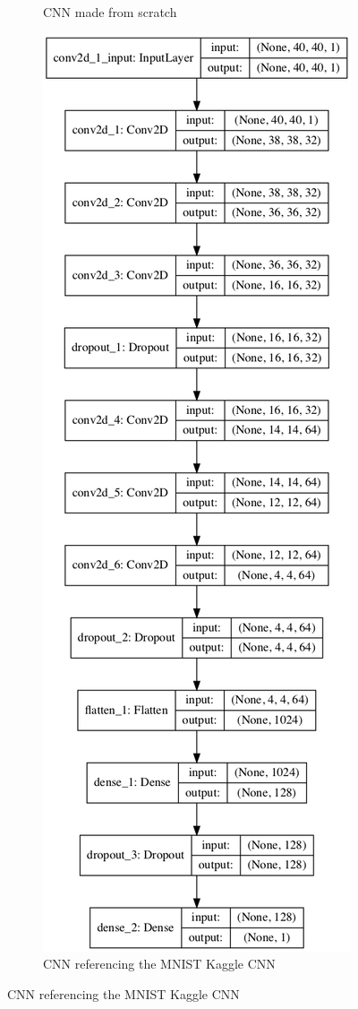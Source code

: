\documentclass[a4paper,fleqn,usenatbib]{mnras}
\begin{document}
\begin{figure}
\begin{subfigure}{0.8\columnwidth}
 \caption{CNN made from scratch}
 \label{fig:ScratchCNN}
 \end{subfigure}
 \begin{subfigure}{0.8\columnwidth}
 \includegraphics[width=\columnwidth]{../Figures/CNN_model}
 \caption{CNN referencing the MNIST Kaggle CNN}
 \label{fig:MNISTCNN}
 \end{subfigure}


\end{figure}
\end{document}

